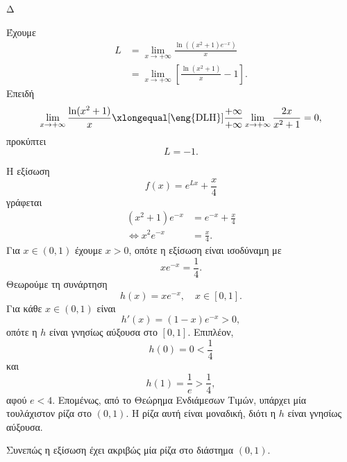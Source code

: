 \begin{thema}{Δ}
\begin{erwthma}
\item Έχουμε
\begin{align*}
L
&=\lim_{x\to+\infty}\frac{\ln\left((x^2+1)e^{-x}\right)}{x}\\
&=\lim_{x\to+\infty}
\left[
\frac{\ln(x^2+1)}{x}-1
\right].
\end{align*}
Επειδή
\[
\lim_{x\to+\infty}\frac{\ln(x^2+1)}{x}
\xlongequal[\text{\eng{DLH}}]{\frac{+\infty}{+\infty}}
\lim_{x\to+\infty}\frac{2x}{x^2+1}
=0,
\]
προκύπτει
\[
{L=-1}.
\]

Η εξίσωση
\[
f(x)=e^{Lx}+\frac{x}{4}
\]
γράφεται
\begin{align*}
(x^2+1)e^{-x}
&=e^{-x}+\frac{x}{4}\\
\Leftrightarrow
x^2e^{-x}&=\frac{x}{4}.
\end{align*}
Για $x\in(0,1)$ έχουμε $x>0$, οπότε η εξίσωση είναι ισοδύναμη με
\[
xe^{-x}=\frac14.
\]
Θεωρούμε τη συνάρτηση
\[
h(x)=xe^{-x},\quad x\in[0,1].
\]
Για κάθε $x\in(0,1)$ είναι
\[
h'(x)=(1-x)e^{-x}>0,
\]
οπότε η $h$ είναι γνησίως αύξουσα στο $[0,1]$. Επιπλέον,
\[
h(0)=0<\frac14
\]
και
\[
h(1)=\frac1e>\frac14,
\]
αφού $e<4$. Επομένως, από το Θεώρημα Ενδιάμεσων Τιμών, υπάρχει μία τουλάχιστον ρίζα στο $(0,1)$. Η ρίζα αυτή είναι μοναδική, διότι η $h$ είναι γνησίως αύξουσα.

Συνεπώς η εξίσωση έχει ακριβώς μία ρίζα στο διάστημα $(0,1)$.
\end{erwthma}
\end{thema}

